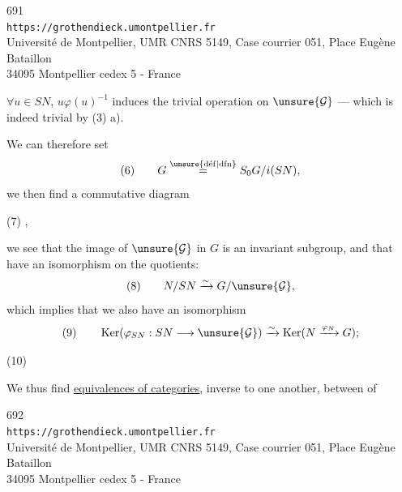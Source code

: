 
\begin{center}
691\\
\texttt{https://grothendieck.umontpellier.fr}\\
Université de Montpellier, UMR CNRS 5149, Case courrier 051, Place Eugène Bataillon\\
34095 Montpellier cedex 5 - France
\end{center}



$\forall u\in SN$, $u\varphi(u)^{-1}$ induces the trivial operation on $\unsure{\mathcal G}$ --- which is indeed trivial by (3) a).

We can therefore set
\[
(6)\qquad  G\overset{\unsure{\mathrm{d\acute ef}|\mathrm{dfn}}}{=}S_0G/i(SN),
\]
we then find a commutative diagram

\noindent (7)\quad
{},

we see that the image of $\unsure{\mathcal G}$ in $G$ is an invariant subgroup, and that  have an isomorphism on the quotients:
\[
(8)\qquad  N/SN\xrightarrow{\sim}G/\unsure{\mathcal G},
\]
which implies that we also have an isomorphism
\[
(9)\qquad  \operatorname{Ker}(\varphi_{SN}:SN\longrightarrow\unsure{\mathcal G})
\xrightarrow{\sim}\operatorname{Ker}(N\xrightarrow{\varphi_N}G);
\]

\noindent (10)\quad
{}

We thus find \uline{equivalences of categories}, inverse to one another, between  of


\begin{center}
692\\
\texttt{https://grothendieck.umontpellier.fr}\\
Université de Montpellier, UMR CNRS 5149, Case courrier 051, Place Eugène Bataillon\\
34095 Montpellier cedex 5 - France
\end{center}


